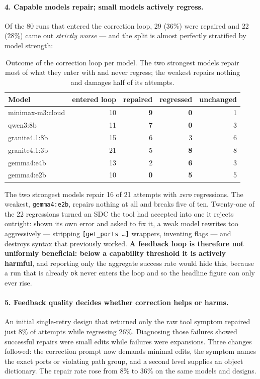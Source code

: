 \documentclass[11pt]{article}
\begin{document}
\paragraph{4. Capable models repair; small models actively regress.} Of the 80 runs that entered the correction loop, 29 (36\%) were repaired and 22 (28\%) came out \emph{strictly worse} --- and the split is almost perfectly stratified by model strength:

\begin{table}[h]
\centering
\small
\begin{tabular}{lrrrr}
\toprule
\textbf{Model} & \textbf{entered loop} & \textbf{repaired} & \textbf{regressed} & \textbf{unchanged} \\
\midrule
minimax-m3:cloud & 10 & \textbf{9} & \textbf{0} & 1 \\
qwen3:8b         & 11 & \textbf{7} & \textbf{0} & 3 \\
granite4.1:8b    & 15 & 6 & 3 & 6 \\
granite4.1:3b    & 21 & 5 & \textbf{8} & 8 \\
gemma4:e4b       & 13 & 2 & \textbf{6} & 3 \\
gemma4:e2b       & 10 & \textbf{0} & \textbf{5} & 5 \\
\bottomrule
\end{tabular}
\caption*{\small Outcome of the correction loop per model. The two strongest models repair most of what they enter with and never regress; the weakest repairs nothing and damages half of its attempts.}
\end{table}

The two strongest models repair 16 of 21 attempts with \emph{zero} regressions. The weakest, \texttt{gemma4:e2b}, repairs nothing at all and breaks five of ten. Twenty-one of the 22 regressions turned an SDC the tool had accepted into one it rejects outright: shown its own error and asked to fix it, a weak model rewrites too aggressively --- stripping \texttt{[get\_ports \dots]} wrappers, inventing flags --- and destroys syntax that previously worked. \textbf{A feedback loop is therefore not uniformly beneficial: below a capability threshold it is actively harmful}, and reporting only the aggregate success rate would hide this, because a run that is already \texttt{ok} never enters the loop and so the headline figure can only ever rise.

\paragraph{5. Feedback quality decides whether correction helps or harms.} An initial single-retry design that returned only the raw tool symptom repaired just 8\% of attempts while regressing 26\%. Diagnosing those failures showed successful repairs were small edits while failures were expansions. Three changes followed: the correction prompt now demands minimal edits, the symptom names the exact ports or violating path group, and a second level supplies an object dictionary. The repair rate rose from 8\% to 36\% on the same models and designs.
\end{document}
